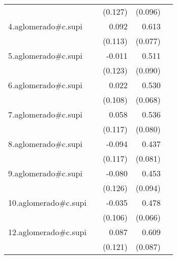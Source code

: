 {\begin{longtable}{l*{4}{D{.}{.}{-1}}}
            &                     &     (0.127)         &     (0.096)         &                     \\
\addlinespace
4.aglomerado#c.supi&                     &       0.092         &       0.613\sym{***}&                     \\
            &                     &     (0.113)         &     (0.077)         &                     \\
\addlinespace
5.aglomerado#c.supi&                     &      -0.011         &       0.511\sym{***}&                     \\
            &                     &     (0.123)         &     (0.090)         &                     \\
\addlinespace
6.aglomerado#c.supi&                     &       0.022         &       0.530\sym{***}&                     \\
            &                     &     (0.108)         &     (0.068)         &                     \\
\addlinespace
7.aglomerado#c.supi&                     &       0.058         &       0.536\sym{***}&                     \\
            &                     &     (0.117)         &     (0.080)         &                     \\
\addlinespace
8.aglomerado#c.supi&                     &      -0.094         &       0.437\sym{***}&                     \\
            &                     &     (0.117)         &     (0.081)         &                     \\
\addlinespace
9.aglomerado#c.supi&                     &      -0.080         &       0.453\sym{***}&                     \\
            &                     &     (0.126)         &     (0.094)         &                     \\
\addlinespace
10.aglomerado#c.supi&                     &      -0.035         &       0.478\sym{***}&                     \\
            &                     &     (0.106)         &     (0.066)         &                     \\
\addlinespace
12.aglomerado#c.supi&                     &       0.087         &       0.609\sym{***}&                     \\
            &                     &     (0.121)         &     (0.087)         &                     \\

\end{longtable}}
